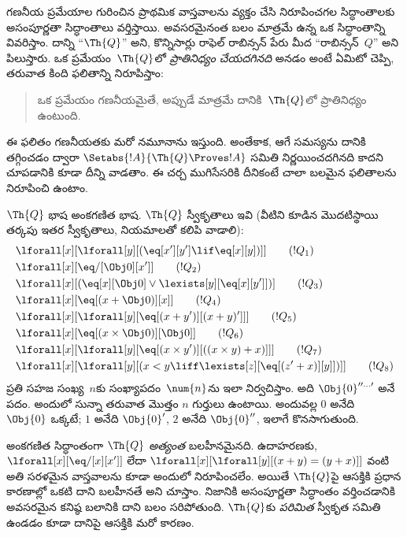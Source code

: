 \documentclass[../../../include/open-logic-section]{subfiles}
\begin{document}

గణనీయ ప్రమేయాల గురించిన ప్రాథమిక వాస్తవాలను వ్యక్తం చేసి నిరూపించగల
సిద్ధాంతాలకు అసంపూర్ణతా సిద్ధాంతాలు వర్తిస్తాయి. అవసరమైనంత బలం మాత్రమే
ఉన్న ఒక సిద్ధాంతాన్ని వివరిస్తాం. దాన్ని ``$\Th{Q}$'' అని, కొన్నిసార్లు
రాఫెల్ రాబిన్సన్ పేరు మీద ``రాబిన్సన్~$Q$'' అని పిలుస్తారు. ఒక ప్రమేయం~$\Th{Q}$లో
\emph{ప్రాతినిధ్యం చేయదగినది} అనడం అంటే ఏమిటో చెప్పి, తరువాత కింది ఫలితాన్ని
నిరూపిస్తాం:
\begin{quote}
  ఒక ప్రమేయం గణనీయమైతే, అప్పుడే మాత్రమే దానికి~$\Th{Q}$లో ప్రాతినిధ్యం ఉంటుంది.
\end{quote}
ఈ ఫలితం గణనీయతకు మరో నమూనాను ఇస్తుంది. అంతేకాక, ఆగే సమస్యను దానికి
తగ్గించడం ద్వారా $\Setabs{!A}{\Th{Q} \Proves !A}$ సమితి నిర్ణయించదగినది
కాదని చూపడానికి కూడా దీన్ని వాడతాం. ఈ చర్చ ముగిసేసరికి దీనికంటే చాలా
బలమైన ఫలితాలను నిరూపించి ఉంటాం.

$\Th{Q}$ భాష అంకగణిత భాష. $\Th{Q}$ స్వీకృతాలు ఇవి
(వీటిని  కూడిన మొదటిస్థాయి తర్కపు ఇతర స్వీకృతాలు, నియమాలతో
కలిపి వాడాలి):
\begin{align*}
& \lforall[x][\lforall[y][(\eq[x'][y'] \lif \eq[x][y])]] \tag{$!Q_1$}\\
& \lforall[x][\eq/[\Obj 0][x']] \tag{$!Q_2$}\\
& \lforall[x][(\eq[x][\Obj 0] \lor \lexists[y][\eq[x][y']])] \tag{$!Q_3$}\\
& \lforall[x][\eq[(x + \Obj 0)][x]] \tag{$!Q_4$}\\
& \lforall[x][\lforall[y][\eq[(x + y')][(x + y)']]] \tag{$!Q_5$}\\
& \lforall[x][\eq[(x \times \Obj 0)][\Obj 0]] \tag{$!Q_6$}\\
& \lforall[x][\lforall[y][\eq[(x \times y')][((x \times y) + x)]]] \tag{$!Q_7$}\\
& \lforall[x][\lforall[y][(x < y \liff \lexists[z][\eq[(z' + x)][y]])]] \tag{$!Q_8$}
\end{align*}
ప్రతి సహజ సంఖ్య~$n$కు సంఖ్యాపదం~$\num{n}$ను ఇలా నిర్వచిస్తాం. అది
$\Obj{0}^{\prime\prime\ldots\prime}$ అనే పదం. అందులో సున్నా తరువాత మొత్తం $n$ గుర్తులు
ఉంటాయి. అందువల్ల $\num{0}$ అనేది ~$\Obj{0}$ ఒక్కటే;
$\num{1}$ అనేది $\Obj{0}'$, $\num{2}$ అనేది $\Obj{0}''$, ఇలాగే కొనసాగుతుంది.

అంకగణిత సిద్ధాంతంగా $\Th{Q}$ \emph{అత్యంత} బలహీనమైనది. ఉదాహరణకు,
$\lforall[x][\eq/[x][x']]$ లేదా $\lforall[x][\lforall[y][(x + y) = (y +
    x)]]$ వంటి అతి సరళమైన వాస్తవాలను కూడా అందులో నిరూపించలేం. అయితే
$\Th{Q}$పై ఆసక్తికి ప్రధాన కారణాల్లో ఒకటి దాని బలహీనతే అని
చూస్తాం. నిజానికి అసంపూర్ణతా సిద్ధాంతం వర్తించడానికి అవసరమైన కనిష్ఠ బలానికి
దాని బలం సరిపోతుంది. $\Th{Q}$కు \emph{పరిమిత} స్వీకృత సమితి ఉండడం కూడా
దానిపై ఆసక్తికి మరో కారణం.
\end{document}
